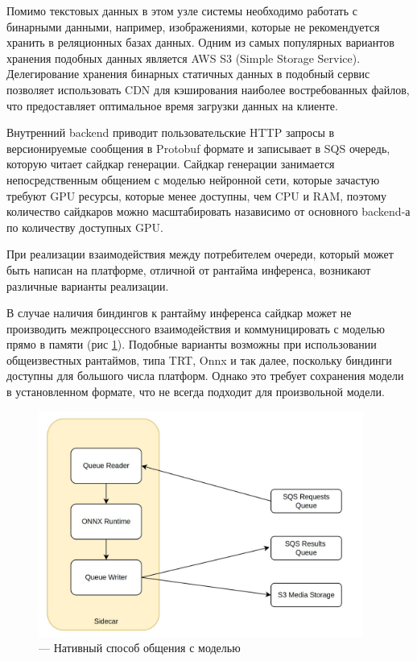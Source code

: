 Помимо текстовых данных в этом узле системы необходимо работать с бинарными данными, например, изображениями, которые
не рекомендуется хранить в реляционных базах данных. Одним из самых популярных вариантов хранения подобных данных
является AWS S3 (Simple Storage Service). Делегирование хранения бинарных статичных данных в подобный сервис позволяет
использовать CDN для кэширования наиболее востребованных файлов, что предоставляет оптимальное время загрузки данных на клиенте.

Внутренний backend приводит пользовательские HTTP запросы в версионируемые сообщения в Protobuf формате и
записывает в SQS очередь, которую читает сайдкар генерации. Сайдкар генерации занимается непосредственным общением
с моделью нейронной сети, которые зачастую требуют GPU ресурсы, которые менее доступны, чем CPU и RAM, поэтому
количество сайдкаров можно масштабировать назависимо от основного backend-а по количеству доступных GPU.

При реализации взаимодействия между потребителем очереди, который может быть написан на платформе, отличной
от рантайма инференса, возникают различные варианты реализации.

В случае наличия биндингов к рантайму инференса сайдкар может не производить межпроцессного взаимодействия
и коммуницировать с моделью прямо в памяти (рис \ref{fig:side1}). Подобные варианты возможны при использовании 
общеизвестных рантаймов, типа TRT, Onnx и так далее, поскольку биндинги доступны для большого числа платформ.
Однако это требует сохранения модели в установленном формате, что не всегда подходит для произвольной модели.


\begin{footnotesize}
\begin{figure}[H]
  \centering
  \includegraphics[width=0.95\textwidth]{img/side1.jpg}
  \caption{--- Нативный способ общения с моделью}
    \label{fig:side1}
\end{figure}
\end{footnotesize}

